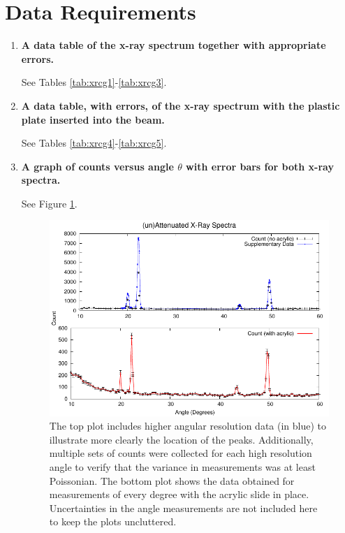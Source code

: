 \section{Data Requirements}
\begin{enumerate}

\item {\bf A data table of the x-ray spectrum together with appropriate errors.}\newline

See Tables \ref{tab:xrcg1}-\ref{tab:xrcg3}.

\item {\bf A data table, with errors, of the x-ray spectrum with the plastic plate inserted into the beam.}\newline

See Tables \ref{tab:xrcg4}-\ref{tab:xrcg5}.

\item {\bf A graph of counts versus angle $\theta$ with error bars for both x-ray spectra.}\newline

See Figure \ref{fig:xrcg1}.

\begin{figure}
\includegraphics{XRaySpec-Angle.pdf}
\caption{The top plot includes higher angular resolution data (in blue) to illustrate more clearly the location of the peaks. Additionally, multiple sets of counts were collected for each high resolution angle to verify that the variance in measurements was at least Poissonian. The bottom plot shows the data obtained for measurements of every degree with the acrylic slide in place. Uncertainties in the angle measurements are not included here to keep the plots uncluttered.}
\label{fig:xrcg1}
\end{figure}


\end{enumerate}
